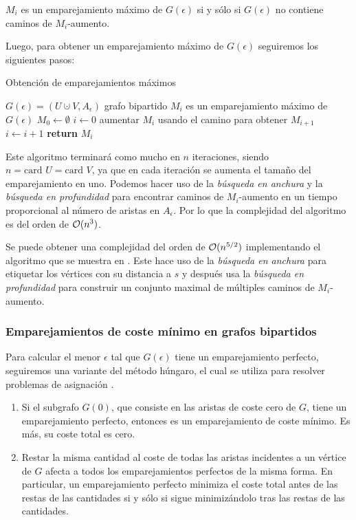 \begin{lemma}
$M_i$ es un emparejamiento máximo de $G(\epsilon)$ si y sólo si $G(\epsilon)$ no contiene caminos de $M_i$-aumento.
\end{lemma}

Luego, para obtener un emparejamiento máximo de $G(\epsilon)$ seguiremos los siguientes pasos:

\begin{algorithm}[!ht]
\caption{Obtención de emparejamientos máximos}\label{ref:algEmpMax}
\begin{algorithmic}[1]
\Require $G(\epsilon)=(U \cupdot V, A_\epsilon)$ grafo bipartido
\Ensure $M_i$ es un emparejamiento máximo de $G(\epsilon)$
\State $M_0\gets \emptyset$
\State $i\gets 0$
	\State aumentar $M_i$ usando el camino para obtener $M_{i+1}$
	\State $i\gets i+1$
\EndWhile
\State \textbf{return} $M_i$
\end{algorithmic}
\end{algorithm}

Este algoritmo terminará como mucho en $n$ iteraciones, siendo $n= \text{card } U = \text{card } V$, ya que en cada iteración se aumenta el tamaño del emparejamiento en uno. Podemos hacer uso de la \emph{búsqueda en anchura} y la \emph{búsqueda en profundidad} para encontrar caminos de $M_i$-aumento en un tiempo proporcional al número de aristas en $A_\epsilon$. Por lo que la complejidad del algoritmo es del orden de $\mathcal{O}(n^3)$.

Se puede obtener una complejidad del orden de $\mathcal{O}(n^{5/2})$ implementando el algoritmo que se muestra en \cite{libroEH}. Este hace uso de la \emph{búsqueda en anchura} para etiquetar los vértices con su distancia a $s$ y después usa la \emph{búsqueda en profundidad} para construir un conjunto maximal de múltiples caminos de $M_i$-aumento.  

\subsubsection*{Emparejamientos de coste mínimo en grafos bipartidos}
Para calcular el menor $\epsilon$ tal que $G(\epsilon)$ tiene un emparejamiento perfecto, seguiremos una variante del método húngaro, el cual se utiliza para resolver problemas de asignación \cite{metodoHungaro}. 

\begin{property}
\leavevmode
\begin{enumerate}
	\item Si el subgrafo $G(0)$, que consiste en las aristas de coste cero de $G$, tiene un emparejamiento perfecto, entonces es un emparejamiento de coste mínimo. Es más, su coste total es cero.
	\item Restar la misma cantidad al coste de todas las aristas incidentes a un vértice de $G$ afecta a todos los emparejamientos perfectos de la misma forma. En particular, un emparejamiento perfecto minimiza el coste total antes de las restas de las cantidades si y sólo si sigue minimizándolo tras las restas de las cantidades.
\end{enumerate}
\end{property}

